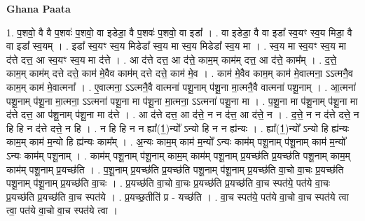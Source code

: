 \documentclass[17pt]{extarticle}
\begin{document}
\textbf{Ghana Paata } \newline

1. प॒शवो॒ वै वै प॒शवः॑ प॒शवो॒ वा इडेडा॒ वै प॒शवः॑ प॒शवो॒ वा इडा᳚ । . वा इडेडा॒ वै वा इडा᳚ स्व॒यꣳ स्व॒य मिडा॒ वै वा इडा᳚ स्व॒यम् । . इडा᳚ स्व॒यꣳ स्व॒य मिडेडा᳚ स्व॒य मा स्व॒य मिडेडा᳚ स्व॒य मा । . स्व॒य मा स्व॒यꣳ स्व॒य मा द॑त्ते दत्त॒ आ स्व॒यꣳ स्व॒य मा द॑त्ते । . आ द॑त्ते दत्त॒ आ द॑त्ते॒ काम॒म् काम॑म् दत्त॒ आ द॑त्ते॒ काम᳚म् । . द॒त्ते॒ काम॒म् काम॑म् दत्ते दत्ते॒ काम॑ मे॒वैव काम॑म् दत्ते दत्ते॒ काम॑ मे॒व । . काम॑ मे॒वैव काम॒म् काम॑ मे॒वात्मना॒ ऽऽत्मनै॒व काम॒म् काम॑ मे॒वात्मना᳚ । . ए॒वात्मना॒ ऽऽत्मनै॒वै वात्मना॑ पशू॒नाम् प॑शू॒ना मा॒त्मनै॒वै वात्मना॑ पशू॒नाम् । . आ॒त्मना॑ पशू॒नाम् प॑शू॒ना मा॒त्मना॒ ऽऽत्मना॑ पशू॒ना मा प॑शू॒ना मा॒त्मना॒ ऽऽत्मना॑ पशू॒ना मा । . प॒शू॒ना मा प॑शू॒नाम् प॑शू॒ना मा द॑त्ते दत्त॒ आ प॑शू॒नाम् प॑शू॒ना मा द॑त्ते । . आ द॑त्ते दत्त॒ आ द॑त्ते॒ न न द॑त्त॒ आ द॑त्ते॒ न । . द॒त्ते॒ न न द॑त्ते दत्ते॒ न हि हि न द॑त्ते दत्ते॒ न हि । . न हि हि न न ह्या᳚(1॒)न्यो᳚ ऽन्यो हि न न ह्य॑न्यः । . ह्या᳚(1॒)न्यो᳚ ऽन्यो हि ह्य॑न्यः काम॒म् काम॑ म॒न्यो हि ह्य॑न्यः काम᳚म् । . अ॒न्यः काम॒म् काम॑ म॒न्यो᳚ ऽन्यः काम॑म् पशू॒नाम् प॑शू॒नाम् काम॑ म॒न्यो᳚ ऽन्यः काम॑म् पशू॒नाम् । . काम॑म् पशू॒नाम् प॑शू॒नाम् काम॒म् काम॑म् पशू॒नाम् प्र॒यच्छ॑ति प्र॒यच्छ॑ति पशू॒नाम् काम॒म् काम॑म् पशू॒नाम् प्र॒यच्छ॑ति । . प॒शू॒नाम् प्र॒यच्छ॑ति प्र॒यच्छ॑ति पशू॒नाम् प॑शू॒नाम् प्र॒यच्छ॑ति वा॒चो वा॒चः प्र॒यच्छ॑ति पशू॒नाम् प॑शू॒नाम् प्र॒यच्छ॑ति वा॒चः । . प्र॒यच्छ॑ति वा॒चो वा॒चः प्र॒यच्छ॑ति प्र॒यच्छ॑ति वा॒च स्पत॑ये॒ पत॑ये वा॒चः प्र॒यच्छ॑ति प्र॒यच्छ॑ति वा॒च स्पत॑ये । . प्र॒यच्छ॒तीति॑ प्र - यच्छ॑ति । . वा॒च स्पत॑ये॒ पत॑ये वा॒चो वा॒च स्पत॑ये त्वा त्वा॒ पत॑ये वा॒चो वा॒च स्पत॑ये त्वा । \newline
\end{document}
